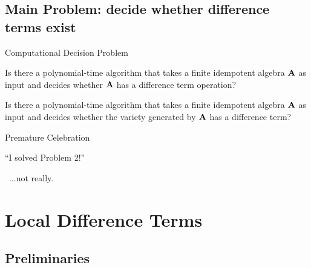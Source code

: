 \documentclass[notes=hide,12pt,xcolor=dvipsnames%
   ]{beamer}
\begin{document}
\subsection{Main Problem: decide whether difference terms exist}

\begin{frame}[label=computational]{Computational Decision Problem}

  \begin{problem}[1]
    \label{prob:2}
    Is there a polynomial-time algorithm that takes a finite
    idempotent algebra $\mathbf{A}$ as input and decides whether 
    $\mathbf{A}$ has a difference term operation?
  \end{problem}

  \pause
  \begin{problem}[2]
  \label{prob:1}
  Is there a polynomial-time algorithm that takes a finite
  idempotent algebra $\mathbf{A}$ as input and decides whether the variety generated by
  $\mathbf{A}$ has a difference term?
  \end{problem}

\end{frame}

\begin{frame}[label=premature]{Premature Celebration}

  \begin{center}
    ``I solved Problem 2!''


    \pause
    ~\phantom{XXXXXXXXXXX}...not really.
  \end{center}
\end{frame}



\section{Local Difference Terms}

\subsection{Preliminaries}
\end{document}
